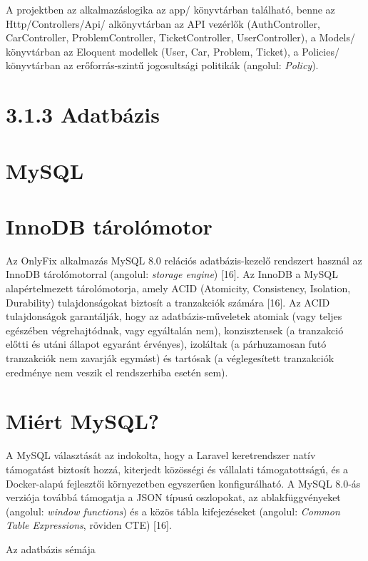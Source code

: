 A projektben az alkalmazáslogika az app/ könyvtárban található, benne az Http/Controllers/Api/ alkönyvtárban az API vezérlők (AuthController, CarController, ProblemController, TicketController, UserController), a Models/ könyvtárban az Eloquent modellek (User, Car, Problem, Ticket), a Policies/ könyvtárban az erőforrás-szintű jogosultsági politikák (angolul: \emph{Policy}).

\section{3.1.3 Adatbázis}\label{adatbuxe1zis}

\section{MySQL}\label{mysql}

\section{InnoDB tárolómotor}\label{innodb-tuxe1roluxf3motor}

Az OnlyFix alkalmazás MySQL 8.0 relációs adatbázis-kezelő rendszert használ az InnoDB tárolómotorral (angolul: \emph{storage engine}) {[}16{]}. Az InnoDB a MySQL alapértelmezett tárolómotorja, amely ACID (Atomicity, Consistency, Isolation, Durability) tulajdonságokat biztosít a tranzakciók számára {[}16{]}. Az ACID tulajdonságok garantálják, hogy az adatbázis-műveletek atomiak (vagy teljes egészében végrehajtódnak, vagy egyáltalán nem), konzisztensek (a tranzakció előtti és utáni állapot egyaránt érvényes), izoláltak (a párhuzamosan futó tranzakciók nem zavarják egymást) és tartósak (a véglegesített tranzakciók eredménye nem veszik el rendszerhiba esetén sem).

\section{Miért MySQL?}\label{miuxe9rt-mysql}

A MySQL választását az indokolta, hogy a Laravel keretrendszer natív támogatást biztosít hozzá, kiterjedt közösségi és vállalati támogatottságú, és a Docker-alapú fejlesztői környezetben egyszerűen konfigurálható. A MySQL 8.0-ás verziója továbbá támogatja a JSON típusú oszlopokat, az ablakfüggvényeket (angolul: \emph{window functions}) és a közös tábla kifejezéseket (angolul: \emph{Common Table Expressions}, röviden CTE) {[}16{]}.

Az adatbázis sémája

